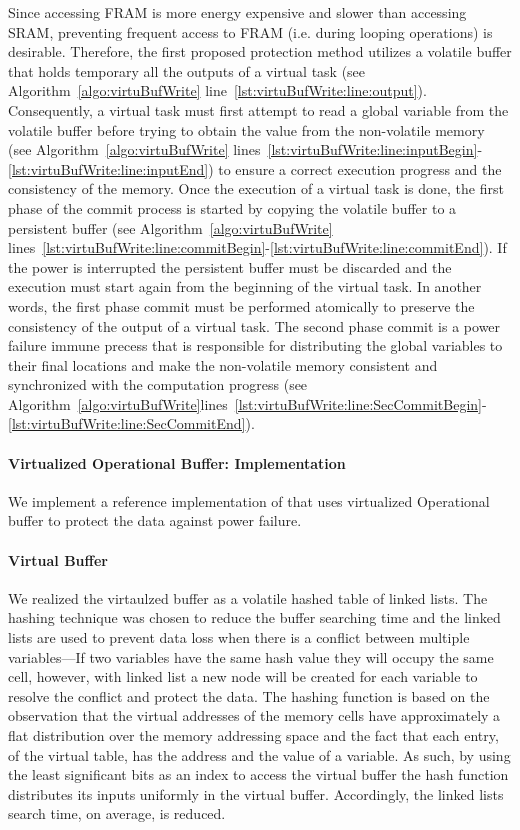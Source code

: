 		Since accessing FRAM is more energy expensive and slower than accessing SRAM, preventing frequent access to FRAM (i.e. during looping operations) is desirable. Therefore, the first proposed protection method utilizes a volatile buffer that holds temporary all the outputs of a virtual task (see Algorithm~\ref{algo:virtuBufWrite} line~\ref{lst:virtuBufWrite:line:output}). Consequently, a virtual task must first attempt to read a global variable from the volatile buffer before trying to obtain the value from the non-volatile memory (see Algorithm~\ref{algo:virtuBufWrite} lines~\ref{lst:virtuBufWrite:line:inputBegin}-\ref{lst:virtuBufWrite:line:inputEnd}) to ensure a correct execution progress and the consistency of the memory. Once the execution of a virtual task is done, the first phase of the commit process is started by copying the volatile buffer to a persistent buffer (see Algorithm~\ref{algo:virtuBufWrite} lines~\ref{lst:virtuBufWrite:line:commitBegin}-\ref{lst:virtuBufWrite:line:commitEnd}). If the power is interrupted the persistent buffer must be discarded and the execution must start again from the beginning of the virtual task. In another words, the first phase commit must be performed atomically to preserve the consistency of the output of a virtual task. The second phase commit is a power failure immune precess that is responsible for distributing the global variables to their final locations and make the non-volatile memory consistent and synchronized with the computation progress (see Algorithm~\ref{algo:virtuBufWrite}lines~\ref{lst:virtuBufWrite:line:SecCommitBegin}-\ref{lst:virtuBufWrite:line:SecCommitEnd}).


	\paragraph{Virtualized Operational Buffer: Implementation} 

		We implement a reference implementation of \sys that uses virtualized Operational buffer to protect the data against power failure. 
		\paragraph{Virtual Buffer}
			We realized the virtaulzed buffer as a volatile hashed table of linked lists. The hashing technique was chosen to reduce the buffer searching time and the linked lists are used to prevent data loss when there is a conflict between multiple variables---If two variables have the same hash value they will occupy the same cell, however, with linked list a new node will be created for each variable to resolve the conflict and protect the data. The hashing function is based on the observation that the virtual addresses of the memory cells have approximately a flat distribution over the memory addressing space and the fact that each entry, of the virtual table, has the address and the value of a variable. As such, by using the least significant bits as an index to access the virtual buffer the hash function distributes its inputs uniformly in the virtual buffer. Accordingly, the linked lists search time, on average, is reduced. 

